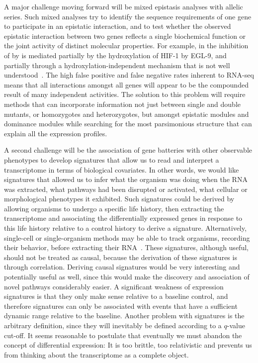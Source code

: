 A major challenge moving forward will be mixed epistasis analyses with allelic
series. Such mixed analyses try to identify the sequence requirements of one
gene to participate in an epistatic interaction, and to test whether the
observed epistatic interaction between two genes reflects a single biochemical
function or the joint activity of distinct molecular properties. For example, in
\cel{} the inhibition of  by  is mediated partially by
the hydroxylation of HIF-1 by EGL-9, and partially through a
hydroxylation-independent mechanism that is not well
understood~\citep{Shao2009}. The high false positive and false negative rates
inherent to RNA-seq means that all interactions amongst all genes will appear to
be the compounded result of many independent activities. The solution to this
problem will require methods that can incorporate information not just between
single and double mutants, or homozygotes and heterozygotes, but amongst
epistatic modules and dominance modules while searching for the most
parsimonious structure that can explain all the expression profiles.

A second challenge will be the association of gene batteries with other
observable phenotypes to develop signatures that allow us to read and interpret
a transcriptome in terms of biological covariates. In other words, we would like
signatures that allowed us to infer what the organism was doing when the RNA
was extracted, what pathways had been disrupted or activated, what cellular or
morphological phenotypes it exhibited. Such signatures could be derived by
allowing organisms to undergo a specific life history, then extracting the
transcriptome and associating the differentially expressed genes in response to
this life history relative to a control history to derive a signature.
Alternatively, single-cell or single-organism methods may be able to track
organisms, recording their behavior, before extracting their
RNA~\citep{Lane2017}. These signatures, although useful, should not be treated
as causal, because the derivation of these signatures is through correlation.
Deriving causal signatures would be very interesting and potentially useful as
well, since this would make the discovery and association of novel pathways
considerably easier. A significant weakness of expression signatures is that
they only make sense relative to a baseline control, and therefore signatures
can only be associated with events that have a sufficient dynamic range relative
to the baseline. Another problem with signatures is the arbitrary definition,
since they will inevitably be defined according to a \(q\)-value cut-off.
It seems reasonable to postulate that eventually we must abandon the concept of
differential expression: It is too brittle, too relativistic and prevents us
from thinking about the transcriptome as a complete object.

